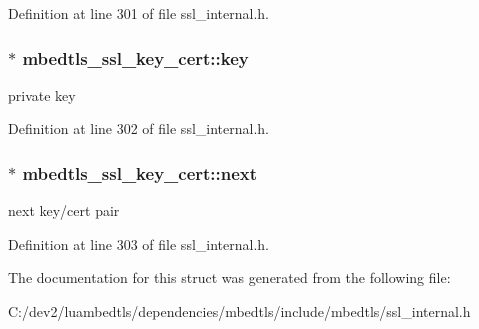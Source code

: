 Definition at line 301 of file ssl\-\_\-internal.\-h.

\hypertarget{structmbedtls__ssl__key__cert_a36357248c58a208bf8e820b75f2f118f}{
\subsubsection[{key}]{$\ast$ mbedtls\-\_\-ssl\-\_\-key\-\_\-cert\-::key}}\label{structmbedtls__ssl__key__cert_a36357248c58a208bf8e820b75f2f118f}
private key 

Definition at line 302 of file ssl\-\_\-internal.\-h.

\hypertarget{structmbedtls__ssl__key__cert_ac8969b0a63df001f997cab96154db160}{
\subsubsection[{next}]{$\ast$ mbedtls\-\_\-ssl\-\_\-key\-\_\-cert\-::next}}\label{structmbedtls__ssl__key__cert_ac8969b0a63df001f997cab96154db160}
next key/cert pair 

Definition at line 303 of file ssl\-\_\-internal.\-h.



The documentation for this struct was generated from the following file\-:\begin{DoxyCompactItemize}
\item 
C\-:/dev2/luambedtls/dependencies/mbedtls/include/mbedtls/ssl\-\_\-internal.\-h\end{DoxyCompactItemize}
